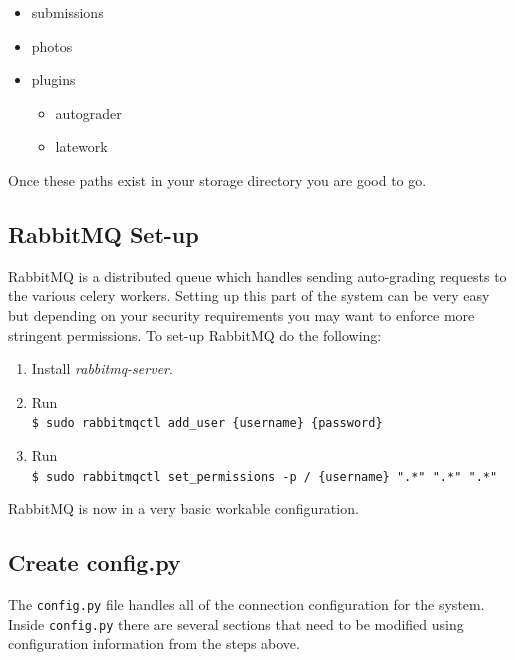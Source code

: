 \documentclass[11pt]{report}
\begin{document}
\begin{itemize}
	\item submissions
	\item photos
	\item plugins
	\begin{itemize}
		\item autograder
		\item latework
	\end{itemize}
\end{itemize}

Once these paths exist in your storage directory you are good to go.

\subsection{RabbitMQ Set-up}

RabbitMQ is a distributed queue which handles sending auto-grading requests to the various celery workers.
Setting up this part of the system can be very easy but depending on your security requirements you may want
to enforce more stringent permissions. To set-up RabbitMQ do the following:

\begin{enumerate}
\item Install \emph{rabbitmq-server}.
\item Run\\ \verb|$ sudo rabbitmqctl add_user {username} {password}|
\item Run\\ \verb|$ sudo rabbitmqctl set_permissions -p / {username} ".*" ".*" ".*"|
\end{enumerate}

RabbitMQ is now in a very basic workable configuration.

\subsection{Create config.py}
\label{sec:config}
The \texttt{config.py} file handles all of the connection configuration for the system.
Inside \texttt{config.py} there are several sections that need to be modified using configuration 
information from the steps above.
\end{document}
